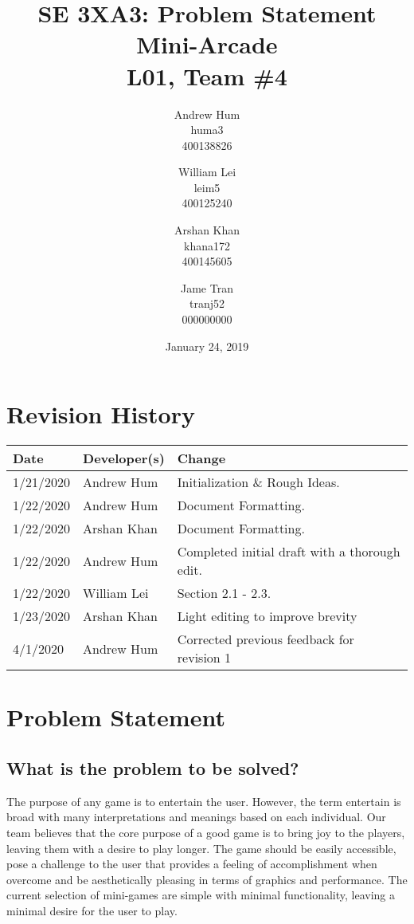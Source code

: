 \documentclass{article}
\title{SE 3XA3: Problem Statement \\ Mini-Arcade \\{\large L01, Team \#4}}
\author{Andrew Hum \\ huma3 \\ 400138826 \and
		William Lei \\ leim5 \\ 400125240 \and
		Arshan Khan \\ khana172 \\ 400145605 \and
		Jame Tran \\ tranj52 \\ 000000000
}
\date{January 24, 2019}
\begin{document}
\maketitle
\newpage

\tableofcontents
\newpage



\begin{table}[hp]
\section{Revision History} \label{TblRevisionHistory}
\begin{tabularx}{\textwidth}{llX}
\hline
\textbf{Date} & \textbf{Developer(s)} & \textbf{Change}\\
\hline
1/21/2020 & Andrew Hum & Initialization \& Rough Ideas.\\
\hline
1/22/2020 & Andrew Hum  & Document Formatting.\\
\hline
1/22/2020 & Arshan Khan & Document Formatting.\\
\hline
1/22/2020 & Andrew Hum & Completed initial draft with a thorough edit. \\
\hline
1/22/2020 & William Lei & Section 2.1 - 2.3.\\
\hline
1/23/2020 & Arshan Khan & Light editing to improve brevity\\
\hline
4/1/2020 & Andrew Hum & Corrected previous feedback for revision 1\\
\hline
\end{tabularx}
\end{table}

\newpage

\section{Problem Statement}
\subsection{What is the problem to be solved?}
The purpose of any game is to entertain the user. However, the term entertain is broad with many interpretations and meanings based on each individual. Our team believes that the core purpose of a good game is to bring joy to the players, leaving them with a desire to play longer. The game should be easily accessible, pose a challenge to the user that provides a feeling of accomplishment when overcome and be aesthetically pleasing in terms of graphics and performance. The current selection of mini-games are simple with minimal functionality, leaving a minimal desire for the user to play. 
\end{document}
